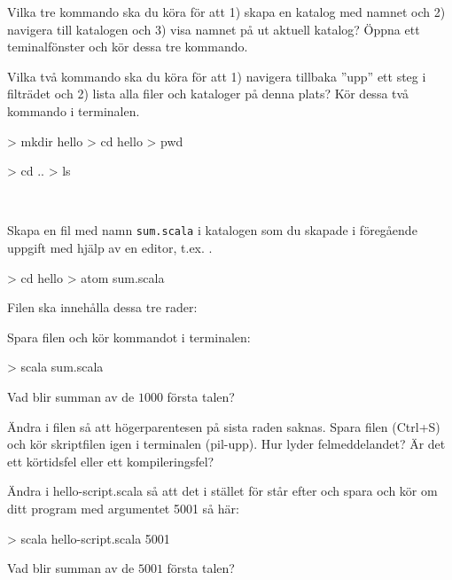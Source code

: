 \Subtask Vilka tre kommando ska du köra för att 1) skapa en katalog med namnet  och 2)  navigera till katalogen och 3) visa namnet på ut aktuell katalog? Öppna ett teminalfönster och kör dessa tre kommando.

\Subtask Vilka två kommando ska du köra för att 1) navigera tillbaka ''upp'' ett steg i filträdet och 2) lista alla filer och kataloger på denna plats? Kör dessa två kommando i terminalen.

\SOLUTION

\TaskSolved \what

\SubtaskSolved

\begin{REPL}
> mkdir hello
> cd hello
> pwd
\end{REPL}

\SubtaskSolved

\begin{REPL}
> cd ..
> ls
\end{REPL}


\QUESTEND










\QUESTBEGIN

\Task  \what~

\Subtask Skapa en fil med namn \texttt{sum.scala} i katalogen  som du skapade i föregående uppgift med hjälp av en editor, t.ex. .
\begin{REPLnonum}
> cd hello
> atom sum.scala
\end{REPLnonum}

\noindent Filen ska innehålla dessa tre rader:

\noindent Spara filen och kör kommandot  i terminalen:
\begin{REPLnonum}
> scala sum.scala
\end{REPLnonum}

\noindent Vad blir summan av de $1000$ första talen?

\Subtask Ändra i filen  så att högerparentesen på sista raden saknas. Spara filen (Ctrl+S) och kör skriptfilen igen i terminalen (pil-upp). Hur lyder felmeddelandet? Är det ett körtidsfel eller ett kompileringsfel?

\Subtask Ändra i hello-script.scala så att det i stället för  står  efter  och spara och kör om ditt program med argumentet 5001 så här:
\begin{REPL}
> scala hello-script.scala 5001
\end{REPL}
\noindent Vad blir summan av de $5001$ första talen?

